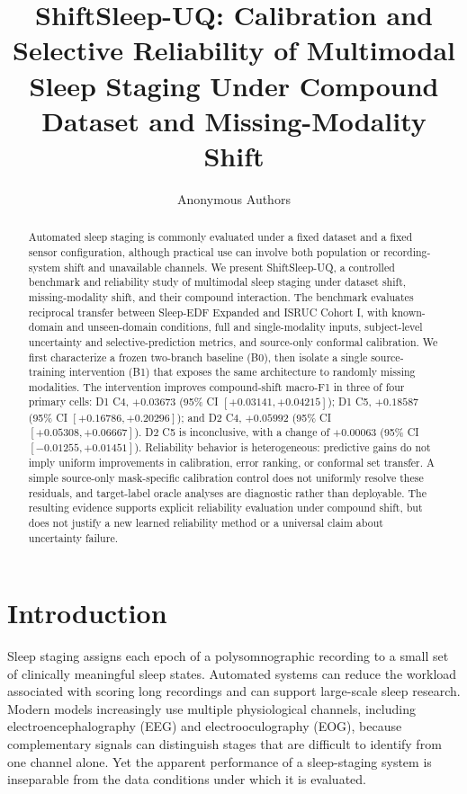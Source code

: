\documentclass[11pt]{article}
\title{ShiftSleep-UQ: Calibration and Selective Reliability of Multimodal Sleep Staging Under Compound Dataset and Missing-Modality Shift}
\author{Anonymous Authors}
\date{}
\begin{document}
\maketitle

\begin{abstract}
Automated sleep staging is commonly evaluated under a fixed dataset and a fixed sensor configuration, although practical use can involve both population or recording-system shift and unavailable channels. We present ShiftSleep-UQ, a controlled benchmark and reliability study of multimodal sleep staging under dataset shift, missing-modality shift, and their compound interaction. The benchmark evaluates reciprocal transfer between Sleep-EDF Expanded and ISRUC Cohort I, with known-domain and unseen-domain conditions, full and single-modality inputs, subject-level uncertainty and selective-prediction metrics, and source-only conformal calibration. We first characterize a frozen two-branch baseline (B0), then isolate a single source-training intervention (B1) that exposes the same architecture to randomly missing modalities. The intervention improves compound-shift macro-F1 in three of four primary cells: D1 C4, $+0.03673$ (95\% CI $[+0.03141,+0.04215]$); D1 C5, $+0.18587$ (95\% CI $[+0.16786,+0.20296]$); and D2 C4, $+0.05992$ (95\% CI $[+0.05308,+0.06667]$). D2 C5 is inconclusive, with a change of $+0.00063$ (95\% CI $[-0.01255,+0.01451]$). Reliability behavior is heterogeneous: predictive gains do not imply uniform improvements in calibration, error ranking, or conformal set transfer. A simple source-only mask-specific calibration control does not uniformly resolve these residuals, and target-label oracle analyses are diagnostic rather than deployable. The resulting evidence supports explicit reliability evaluation under compound shift, but does not justify a new learned reliability method or a universal claim about uncertainty failure.
\end{abstract}

\section{Introduction}
Sleep staging assigns each epoch of a polysomnographic recording to a small set of clinically meaningful sleep states. Automated systems can reduce the workload associated with scoring long recordings and can support large-scale sleep research. Modern models increasingly use multiple physiological channels, including electroencephalography (EEG) and electrooculography (EOG), because complementary signals can distinguish stages that are difficult to identify from one channel alone. Yet the apparent performance of a sleep-staging system is inseparable from the data conditions under which it is evaluated.
\end{document}
